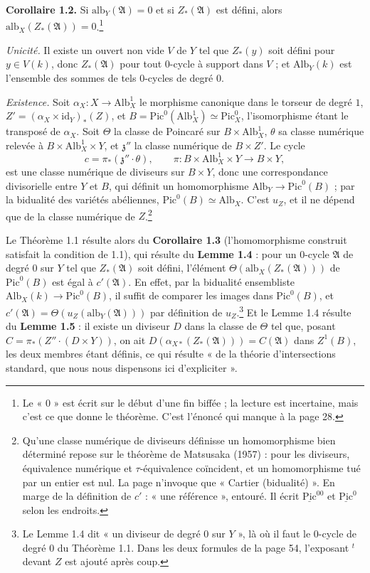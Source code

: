 \documentclass[11pt,a4paper]{article}
\begin{document}
\textbf{Corollaire 1.2.} Si $\mathrm{alb}_{Y}(\mathfrak{A}) = 0$ et si
$Z_{*}(\mathfrak{A})$ est défini, alors $\mathrm{alb}_{X}(Z_{*}(\mathfrak{A})) =
0$.\footnote{Le « $0$ » est écrit sur le début d'une fin biffée ; la lecture
est incertaine, mais c'est ce que donne le théorème. C'est l'énoncé qui manque à
la page 28.}

\emph{Unicité.} Il existe un ouvert non vide $V$ de $Y$ tel que $Z_{*}(y)$ soit
défini pour $y \in V(k)$, donc $Z_{*}(\mathfrak{A})$ pour tout $0$-cycle à
support dans $V$ ; et $\mathrm{Alb}_{Y}(k)$ est l'ensemble des sommes de tels
$0$-cycles de degré $0$.

\emph{Existence.} Soit $\alpha_{X} \colon X \to \mathrm{Alb}^{1}_{X}$ le
morphisme canonique dans le torseur de degré $1$, $Z' = (\alpha_{X} \times
\mathrm{id}_{Y})_{*}(Z)$, et $B = \mathrm{Pic}^{0}(\mathrm{Alb}^{1}_{X}) \simeq
\mathrm{Pic}^{0}_{X}$, l'isomorphisme étant le transposé de $\alpha_{X}$. Soit
$\Theta$ la classe de Poincaré sur $B \times \mathrm{Alb}^{1}_{X}$, $\theta$ sa
classe numérique relevée à $B \times \mathrm{Alb}^{1}_{X} \times Y$, et
$\mathfrak{z}''$ la classe numérique de $B \times Z'$. Le cycle
\[
c = \pi_{*}(\mathfrak{z}'' \cdot \theta) , \qquad \pi \colon B \times
\mathrm{Alb}^{1}_{X} \times Y \to B \times Y ,
\]
est une classe numérique de diviseurs sur $B \times Y$, donc une correspondance
divisorielle entre $Y$ et $B$, qui définit un homomorphisme $\mathrm{Alb}_{Y} \to
\mathrm{Pic}^{0}(B)$ ; par la bidualité des variétés abéliennes,
$\mathrm{Pic}^{0}(B) \simeq \mathrm{Alb}_{X}$. C'est $u_{Z}$, et il ne dépend
que de la classe numérique de $Z$.\footnote{Qu'une classe numérique de
diviseurs définisse un homomorphisme bien déterminé repose sur le théorème de
Matsusaka (1957) : pour les diviseurs, équivalence numérique et
$\tau$-équivalence coïncident, et un homomorphisme tué par un entier est nul.
La page n'invoque que « Cartier (bidualité) ». En marge de la définition de
$c'$ : « une référence », entouré. Il écrit $\underline{\mathrm{Pic}}^{00}$ et
$\underline{\mathrm{Pic}}^{0}$ selon les endroits.}

Le Théorème 1.1 résulte alors du \textbf{Corollaire 1.3} (l'homomorphisme
construit satisfait la condition de 1.1), qui résulte du \textbf{Lemme 1.4} :
pour un $0$-cycle $\mathfrak{A}$ de degré $0$ sur $Y$ tel que
$Z_{*}(\mathfrak{A})$ soit défini, l'élément
$\Theta(\mathrm{alb}_{X}(Z_{*}(\mathfrak{A})))$ de $\mathrm{Pic}^{0}(B)$ est
égal à $c'(\mathfrak{A})$. En effet, par la bidualité ensembliste
$\mathrm{Alb}_{X}(k) \to \mathrm{Pic}^{0}(B)$, il suffit de comparer les images
dans $\mathrm{Pic}^{0}(B)$, et $c'(\mathfrak{A}) =
\Theta(u_{Z}(\mathrm{alb}_{Y}(\mathfrak{A})))$ par définition de
$u_{Z}$.\footnote{Le Lemme 1.4 dit « un diviseur de degré $0$ sur $Y$ », là où
il faut le $0$-cycle de degré $0$ du Théorème 1.1. Dans les deux formules de la
page 54, l'exposant ${}^{t}$ devant $Z$ est ajouté après coup.} Et le Lemme 1.4
résulte du \textbf{Lemme 1.5} : il existe un diviseur $D$ dans la classe de
$\Theta$ tel que, posant $C = \pi_{*}(Z'' \cdot (D \times Y))$, on ait
$D(\alpha_{X*}(Z_{*}(\mathfrak{A}))) = C(\mathfrak{A})$ dans $Z^{1}(B)$, les deux
membres étant définis, ce qui résulte « de la théorie d'intersections standard, que nous
nous dispensons ici d'expliciter ».
\end{document}
